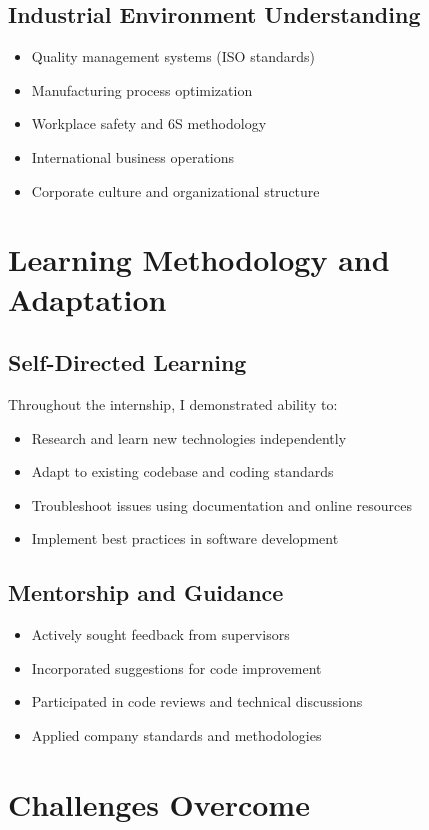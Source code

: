 \subsection{Industrial Environment Understanding}
\begin{itemize}
    \item Quality management systems (ISO standards)
    \item Manufacturing process optimization
    \item Workplace safety and 6S methodology
    \item International business operations
    \item Corporate culture and organizational structure
\end{itemize}

\section{Learning Methodology and Adaptation}

\subsection{Self-Directed Learning}
Throughout the internship, I demonstrated ability to:
\begin{itemize}
    \item Research and learn new technologies independently
    \item Adapt to existing codebase and coding standards
    \item Troubleshoot issues using documentation and online resources
    \item Implement best practices in software development
\end{itemize}

\subsection{Mentorship and Guidance}
\begin{itemize}
    \item Actively sought feedback from supervisors
    \item Incorporated suggestions for code improvement
    \item Participated in code reviews and technical discussions
    \item Applied company standards and methodologies
\end{itemize}

\section{Challenges Overcome}

